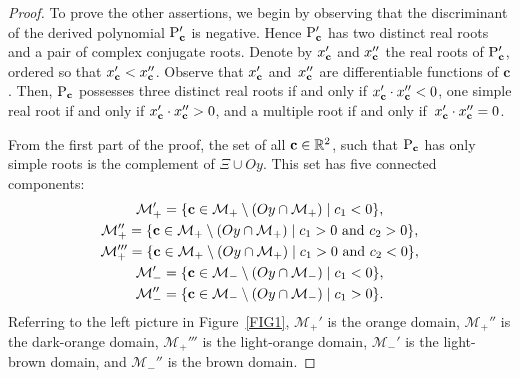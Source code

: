 \documentclass[pdftex]{sigma}
\numberwithin{equation}{section}
\def\R{\mathbb{R}}
\begin{document}
\begin{proof}
To prove the other assertions, we begin by observing that the discriminant of the derived polynomial ${\rm P}'_{{\bf c}}$
is negative. Hence
${\rm P}'_{{\bf c}}$ has two distinct real roots and a pair of complex conjugate roots.
Denote by $x'_{{\bf c}}$ and $x''_{{\bf c}}$ the real roots of ${\rm P}'_{{\bf c}}$,
ordered so that
$x'_{{\bf c}}<x''_{{\bf c}}$. Observe that $x'_{{\bf c}}$ and~$x''_{{\bf c}}$ are differentiable functions of $\textbf{c}$.
Then, ${\rm P}_{{\bf c}}$ possesses three distinct real roots if and only if $x'_{{\bf c}}\cdot x''_{{\bf c}}<0$,
one simple real root if and only if $x'_{{\bf c}}\cdot x''_{{\bf c}}>0$,
and a multiple root if and only if~$x'_{{\bf c}}\cdot x''_{{\bf c}}=0$.

From the first part of the proof, the set of all ${\bf c}\in \R^2$, such that ${\rm P}_{{\bf c}}$ has only simple roots
is the complement of $\Xi\cup Oy$. This set has five connected components:
%
%
%
\begin{gather}
{\mathcal M}_+' =  \{{\bf c}\in {\mathcal M}_+\setminus (Oy\cap {\mathcal M}_+ ) \mid c_1<0  \}, \nonumber \\
{\mathcal M}_+'' = \{{\bf c}\in {\mathcal M}_+\setminus (Oy\cap {\mathcal M}_+) \mid c_1>0\  \text{and}\  c_2>0  \}, \nonumber \\
{\mathcal M}_+''' = \{{\bf c}\in{\mathcal M}_+\setminus (Oy\cap {\mathcal M}_+) \mid c_1>0\ \text{and}\  c_2<0  \}, \nonumber \\
{\mathcal M}_-' = \{{\bf c}\in {\mathcal M}_-\setminus (Oy\cap {\mathcal M}_-) \mid c_1<0  \}, \nonumber \\
{\mathcal M}_-'' = \{{\bf c}\in {\mathcal M}_-\setminus (Oy\cap {\mathcal M}_-) \mid c_1>0  \}.\label{connectedcomponents}
 \end{gather}
Referring to
the left picture in Figure~\ref{FIG1}, ${\mathcal M}_+'$ is the orange domain, ${\mathcal M}_+''$ is the dark-orange domain,
${\mathcal M}_+'''$ is the light-orange domain, ${\mathcal M}_-'$ is the light-brown domain, and ${\mathcal M}_-''$ is the brown domain.


\end{proof}
\end{document}
